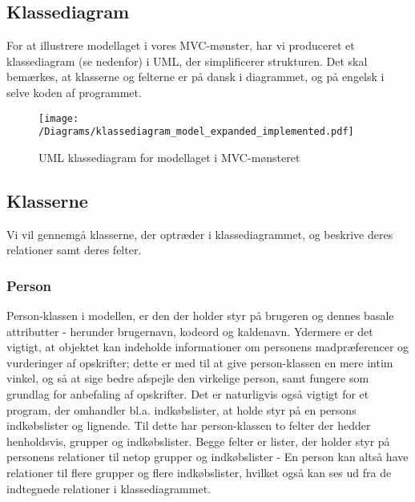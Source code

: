 \subsection{Klassediagram}
For at illustrere modellaget i vores MVC-mønster, har vi produceret et klassediagram (se  nedenfor) i UML, der simplificerer strukturen.
Det skal bemærkes, at klasserne og felterne er på dansk i diagrammet, og på engelsk i selve koden af programmet. 

\begin{figure}[H]
\centering
\texttt{[image: /Diagrams/klassediagram\_model\_expanded\_implemented.pdf]}
\caption{UML klassediagram for modellaget i MVC-mønsteret}\label{diagram:klassediagram}
\end{figure}

\subsection{Klasserne}
Vi vil gennemgå klasserne, der optræder i klassediagrammet, og beskrive deres relationer samt deres felter.


\subsubsection{Person}
Person-klassen i modellen, er den der holder styr på brugeren og dennes basale attributter - herunder brugernavn, kodeord og kaldenavn.
Ydermere er det vigtigt, at objektet kan indeholde informationer om personens madpræferencer og vurderinger af opskrifter; dette er med til at give person-klassen en mere intim vinkel, og så at sige bedre afspejle den virkelige person, samt fungere som grundlag for anbefaling af opskrifter.
Det er naturligvis også vigtigt for et program, der omhandler bl.a. indkøbslister, at holde styr på en persons indkøbslister og lignende.
Til dette har person-klassen to felter der hedder henholdsvis, grupper og indkøbslister.
Begge felter er lister, der holder styr på personens relationer til netop grupper og indkøbslister - En person kan altså have relationer til flere grupper og flere indkøbslister, hvilket også kan ses ud fra de indtegnede relationer i klassediagrammet.


